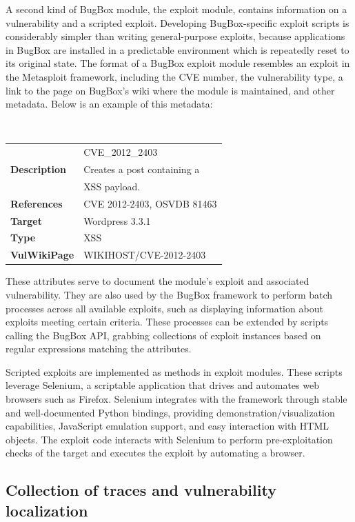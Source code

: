 \documentclass[letterpaper,twocolumn,10pt]{article}
\begin{document}
A second kind of BugBox module, the exploit module, contains information on a vulnerability and a scripted exploit. Developing BugBox-specific exploit scripts is considerably simpler than writing general-purpose exploits, because applications in BugBox are installed in a predictable environment which is repeatedly reset to its original state. The format of a BugBox exploit module resembles an exploit in the Metasploit framework, including the CVE number, the vulnerability type, a link to the page on BugBox's wiki where the module is maintained, and other metadata. Below is an example of this metadata:

\begin{minipage}{\textwidth}
{\tt \small
\begin{tabular} { l l }
\noindent{\bf Name}&CVE\_2012\_2403\\
{\bf Description}&Creates a post containing a\\& XSS payload.\\
{\bf References}&CVE 2012-2403, OSVDB 81463 \\
{\bf Target}&Wordpress 3.3.1\\
{\bf Type}&XSS\\
{\bf VulWikiPage}&WIKIHOST/CVE-2012-2403
\end{tabular}
}
\end{minipage}

These attributes serve to document the module's exploit and associated vulnerability. They are also used by the BugBox framework to perform batch processes across all available exploits, such as displaying information about exploits meeting certain criteria. These processes can be extended by scripts calling the BugBox API, grabbing collections of exploit instances based on regular expressions matching the attributes.

Scripted exploits are implemented as methods in exploit modules. These scripts leverage Selenium, a scriptable application that drives and automates web browsers such as Firefox. Selenium integrates with the framework through stable and well-documented Python bindings, providing demonstration/visualization capabilities, JavaScript emulation support, and easy interaction with HTML objects. The exploit code interacts with Selenium to perform pre-exploitation checks of the target and executes the exploit by automating a browser.

\subsection{Collection of traces and vulnerability localization}
\end{document}

